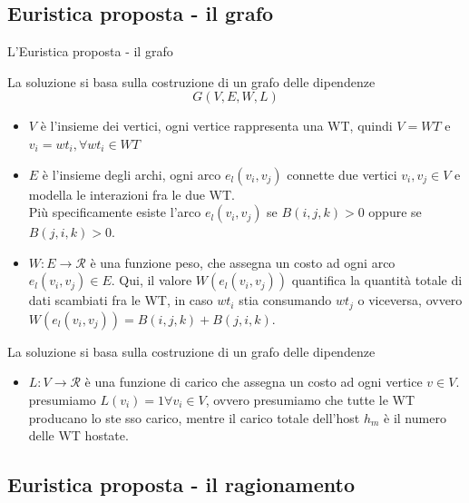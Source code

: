 \documentclass{beamer}
\begin{document}
\subsection{Euristica proposta - il grafo}
\begin{frame}[allowframebreaks]{L'Euristica proposta - il grafo}
	\begin{block}{La soluzione si basa sulla costruzione di un grafo delle dipendenze}
		\[
			 G(V,E,W,L)
		\]
		\begin{itemize}
			\item $V$ è l'insieme dei vertici, ogni vertice rappresenta una WT, quindi $V = WT$ e $v_i = wt_i, \forall wt_i \in WT$
			\item $E$ è l'insieme degli archi, ogni arco $e_l(v_i, v_j)$ connette due vertici $v_i, v_j \in V$ e modella le interazioni fra le due WT. \\
			Più specificamente esiste l'arco $e_l(v_i, v_j)$ se $B(i, j, k ) > 0$ oppure se $B(j, i, k ) > 0$.
			\item $W: E \rightarrow \mathcal{R}$ è una funzione peso, che assegna un costo ad ogni arco $e_l(v_i, v_j) \in E$. Qui, il valore $W(e_l(v_i, v_j))$ quantifica la quantità totale di dati scambiati fra le WT, in caso $wt_i$ stia consumando $wt_j$ o viceversa, ovvero $W(e_l(v_i, v_j)) = B(i, j, k) + B(j, i, k)$.

		\end{itemize}
	\end{block}
	\begin{block}{La soluzione si basa sulla costruzione di un grafo delle dipendenze}
		\begin{itemize}
						\item $L : V \rightarrow \mathcal{R}$ è una funzione di carico che assegna un costo ad ogni vertice $v \in V$. \\ presumiamo $L(v_i) = 1 \forall v_i \in V$, ovvero presumiamo che tutte le WT producano lo ste sso carico, mentre il carico totale dell'host $h_m$  è  il numero delle WT hostate. \\
		\end{itemize}
	\end{block}
\end{frame}

\subsection{Euristica proposta - il ragionamento}
\end{document}

